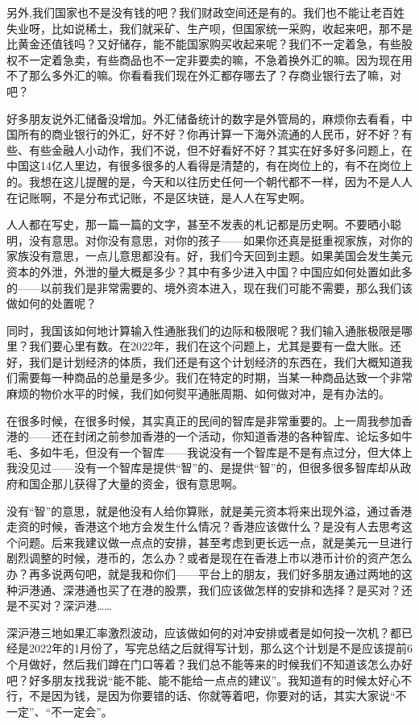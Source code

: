 \documentclass[UTF8, 12pt, a4paper]{ctexrep}
\begin{document}
另外,我们国家也不是没有钱的吧？我们财政空间还是有的。我们也不能让老百姓失业呀，比如说稀土，我们就采矿、生产呗，但国家统一采购，收起来吧，那不是比黄金还值钱吗？又好储存，能不能国家购买收起来呢？我们不一定着急，有些股权不一定着急卖，有些商品也不一定非要卖的嘛，不急着换外汇的嘛。因为现在用不了那么多外汇的嘛。你看看我们现在外汇都存哪去了？存商业银行去了嘛，对吧？

好多朋友说外汇储备没增加。外汇储备统计的数字是外管局的，麻烦你去看看，中国所有的商业银行的外汇，好不好？你再计算一下海外流通的人民币，好不好？有些、有些金融人小动作，我们不说，但不好看好不好？其实在好多好多问题上，在中国这14亿人里边，有很多很多的人看得是清楚的，有在岗位上的，有不在岗位上的。我想在这儿提醒的是，今天和以往历史任何一个朝代都不一样，因为不是人人在记账啊，不是分布式记账，不是区块链，是人人在写史啊。

人人都在写史，那一篇一篇的文字，甚至不发表的札记都是历史啊。不要晒小聪明，没有意思。对你没有意思，对你的孩子——如果你还真是挺重视家族，对你的家族没有意思，一点儿意思都没有。好，我们今天回到主题。如果美国会发生美元资本的外泄，外泄的量大概是多少？其中有多少进入中国？中国应如何处置如此多的——以前我们是非常需要的、境外资本进入，现在我们可能不需要，那么我们该做如何的处置呢？

同时，我国该如何地计算输入性通胀我们的边际和极限呢？我们输入通胀极限是哪里？我们要心里有数。在2022年，我们在这个问题上，尤其是要有一盘大账。还好，我们是计划经济的体质，我们还是有这个计划经济的东西在，我们大概知道我们需要每一种商品的总量是多少。我们在特定的时期，当某一种商品达致一个非常麻烦的物价水平的时候，我们如何熨平通胀周期、如何做对冲，是有办法的。

在很多时候，在很多时候，其实真正的民间的智库是非常重要的。上一周我参加香港的——还在封闭之前参加香港的一个活动，你知道香港的各种智库、论坛多如牛毛、多如牛毛，但没有一个智库——我说没有一个智库是不是有点过分，但大体上我没见过——没有一个智库是提供“智”的、是提供“智”的，但很多很多智库却从政府和国企那儿获得了大量的资金，很有意思啊。

没有“智”的意思，就是他没有人给你算账，就是美元资本将来出现外溢，通过香港走资的时候，香港这个地方会发生什么情况？香港应该做什么？是没有人去思考这个问题。后来我建议做一点点的安排，甚至考虑到更长远一点，就是美元一旦进行剧烈调整的时候，港币的，怎么办？或者是现在在香港上市以港币计价的资产怎么办？再多说两句吧，就是我和你们——平台上的朋友，我们好多朋友通过两地的这种沪港通、深港通也买了在港的股票，我们应该做怎样的安排和选择？是买对？还是不买对？深沪港……

深沪港三地如果汇率激烈波动，应该做如何的对冲安排或者是如何投一次机？都已经是2022年的1月份了，写完总结之后就得写计划，那么这个计划是不是应该提前6个月做好，然后我们蹲在门口等着？我们总不能等来的时候我们不知道该怎么办好吧？好多朋友找我说“能不能、能不能给一点点的建议”。我知道有的时候太好心不行，不是因为钱，是因为你要错的话、你就等着吧，你要对的话，其实大家说“不一定”、“不一定会”。
\end{document}
